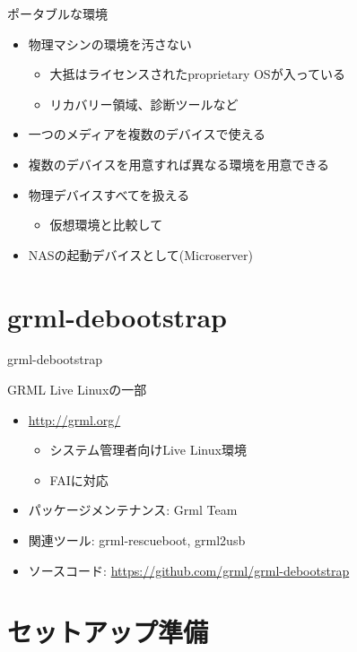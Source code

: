 \begin{frame}[containsverbatim]{ポータブルな環境}
  \begin{itemize}
  \item 物理マシンの環境を汚さない
    \begin{itemize}
    \item 大抵はライセンスされたproprietary OSが入っている
    \item リカバリー領域、診断ツールなど
    \end{itemize}
  \item 一つのメディアを複数のデバイスで使える
  \item 複数のデバイスを用意すれば異なる環境を用意できる
  \item 物理デバイスすべてを扱える
    \begin{itemize}
    \item 仮想環境と比較して
    \end{itemize}
  \item NASの起動デバイスとして(Microserver)
  \end{itemize}
\end{frame}

\section{grml-debootstrap}

\begin{frame}[containsverbatim]{grml-debootstrap}

GRML Live Linuxの一部
\begin{itemize}
  \item \url{http://grml.org/}
    \begin{itemize}
    \item システム管理者向けLive Linux環境
    \item FAIに対応
    \end{itemize}
  \item パッケージメンテナンス: Grml Team
  \item 関連ツール: grml-rescueboot, grml2usb
  \item ソースコード: \url{https://github.com/grml/grml-debootstrap}
\end{itemize}

\end{frame}


\section{セットアップ準備}


